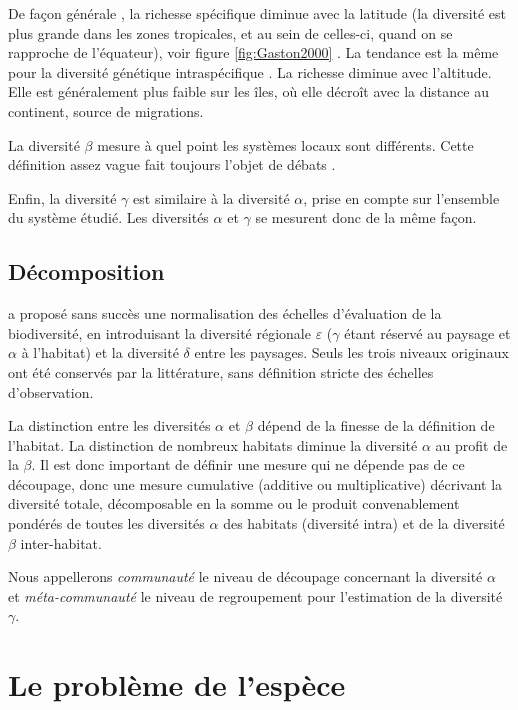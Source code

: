 \documentclass[
  11pt,
  french,
  a4paper,
  extrafontsizes,onecolumn,openright
  ]{memoir}
\begin{document}
De façon générale \autocite{Gaston2000}, la richesse spécifique diminue avec la latitude (la diversité est plus grande dans les zones tropicales, et au sein de celles-ci, quand on se rapproche de l'équateur), voir figure \ref{fig:Gaston2000} \autocite[figure 1]{Gaston2000}.
La tendance est la même pour la diversité génétique intraspécifique \autocite{Miraldo2016}.
La richesse diminue avec l'altitude.
Elle est généralement plus faible sur les îles, où elle décroît avec la distance au continent, source de migrations.

La diversité \(\beta\) mesure à quel point les systèmes locaux sont différents. Cette définition assez vague fait toujours l'objet de débats \autocite{Moreno2010}.

Enfin, la diversité \(\gamma\) est similaire à la diversité \(\alpha\), prise en compte sur l'ensemble du système étudié.
Les diversités \(\alpha\) et \(\gamma\) se mesurent donc de la même façon.

\hypertarget{duxe9composition}{%
\subsection{Décomposition}\label{duxe9composition}}

\textcite{Whittaker1977} a proposé sans succès une normalisation des échelles d'évaluation de la biodiversité, en introduisant la diversité régionale \(\varepsilon\) (\(\gamma\) étant réservé au paysage et \(\alpha\) à l'habitat) et la diversité \(\delta\) entre les paysages.
Seuls les trois niveaux originaux ont été conservés par la littérature, sans définition stricte des échelles d'observation.

La distinction entre les diversités \(\alpha\) et \(\beta\) dépend de la finesse de la définition de l'habitat.
La distinction de nombreux habitats diminue la diversité \(\alpha\) au profit de la \(\beta\).
Il est donc important de définir une mesure qui ne dépende pas de ce découpage, donc une mesure cumulative (additive ou multiplicative) décrivant la diversité totale, décomposable en la somme ou le produit convenablement pondérés de toutes les diversités \(\alpha\) des habitats (diversité intra) et de la diversité \(\beta\) inter-habitat.

Nous appellerons \emph{communauté} le niveau de découpage concernant la diversité \(\alpha\) et \emph{méta-communauté} le niveau de regroupement pour l'estimation de la diversité \(\gamma\).

\hypertarget{le-probluxe8me-de-lespuxe8ce}{%
\section{Le problème de l'espèce}\label{le-probluxe8me-de-lespuxe8ce}}
\end{document}
